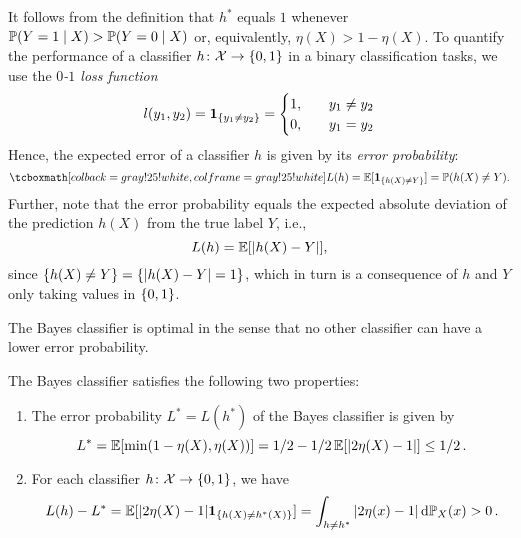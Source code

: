It follows from the definition that $h^*$ equals $1$ whenever $\mathbb{P}(Y = 1 \mathrel{|} X) > \mathbb{P}(Y = 0 \mathrel{|} X)$ or, equivalently, $\eta(X) > 1 - \eta(X)$. To quantify the performance of a classifier $h \colon \mathcal{X} \to \set{0, 1}$ in a binary classification tasks, we use the \emph{$0$-$1$ loss function}
\[
    l(y_1, y_2) = \indSet{y_1 \neq y_2} = \begin{cases}
        1, \quad & y_1 \neq y_2 \\
        0, \quad & y_1 = y_2
    \end{cases}
\]
Hence, the expected error of a classifier $h$ is given by its \emph{error probability}:
\[
    \highlightMath{
        L(h) = \Exp[\indSet{h(X) \neq Y}] = \P(h(X) \neq Y).
    }
\]
Further, note that the error probability equals the expected absolute deviation of the prediction $h(X)$ from the true label $Y$, i.e.,
\[
    L(h) = \operatorname{\mathbb{E}}[\abs{h(X) - Y}],
\]
since $\set{h(X) \neq Y} = \set{\abs{h(X) - Y} = 1}$, which in turn is a consequence of $h$ and $Y$ only taking values in $\set{0, 1}$.

The Bayes classifier is optimal in the sense that no other classifier can have a lower error probability.

\begin{theorem}
\label{thm: bayes classifier}
The Bayes classifier satisfies the following two properties:
\begin{enumerate}
    \item The error probability $L^* = L(h^*)$ of the Bayes classifier is given by
    \begin{equation}
        \label{eq: bayes error}
        L^* = \operatorname{\mathbb{E}}[\min(1 - \eta(X), \eta(X))] = 1/2 - 1/2 \operatorname{\mathbb{E}}[\abs{2\eta(X) - 1}] \leq 1/2 \, .
    \end{equation}

    \item For each classifier $h \colon \mathcal{X} \to \set{0, 1}$, we have
    \begin{equation}
        \label{eq: excess risk}
        L(h) - L^* = \Exp[\abs{2\eta(X) - 1} \indSet{h(X) \neq h^*(X)}] = \int_{h \neq h^*} \abs{2\eta(x) - 1} \dP_X(x) > 0 \, .
    \end{equation}
\end{enumerate}
\end{theorem}

